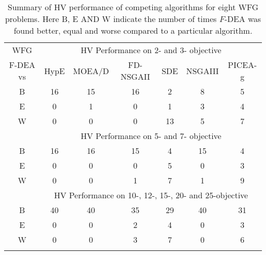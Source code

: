 \begin{table*}[h]
\centering
\caption{Summary of HV performance of competing algorithms for eight WFG problems. Here B, E AND W indicate the number of times  $F$-DEA was found better, equal and worse compared to a particular algorithm.}
	\label{table:wfgsummary}

\renewcommand{\arraystretch}{1.1}
\begin{adjustbox}{width=0.50\textwidth,center}

\begin{tabular}{c|cccccc}
\thickhline
WFG & \multicolumn{6}{c}{HV Performance on 2-  and 3- objective} \\\thickhline
F-DEA vs & HypE & MOEA/D & FD-NSGAII & SDE & NSGAIII & PICEA-g \\\thickhline
B & 16 & 15 & 16 & 2 & 8 & 5 \\
E & 0 & 1 & 0 & 1 & 3 & 4 \\
W & 0 & 0 & 0 & 13 & 5 & 7 \\\thickhline
 & \multicolumn{6}{c}{HV Performance on 5- and 7- objective} \\\thickhline
B & 16 & 16 & 15 & 4 & 15 & 4 \\
E & 0 & 0 & 0 & 5 & 0 & 3 \\
W & 0 & 0 & 1 & 7 & 1 & 9 \\\thickhline
 & \multicolumn{6}{c}{HV Performance on 10-, 12-, 15-, 20- and 25-objective} \\\thickhline
B & 40 & 40 & 35 & 29 & 40 & 31 \\
E & 0 & 0 & 2 & 4 & 0 & 3 \\
W & 0 & 0 & 3 & 7 & 0 & 6 \\\thickhline
\end{tabular}
\end{adjustbox}
\end{table*}